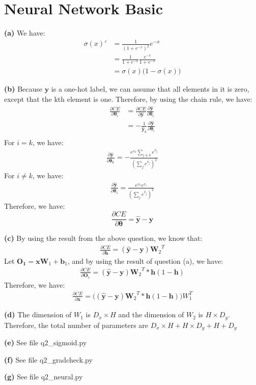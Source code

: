 \documentclass[10pt, a4paper]{ctexart}
\begin{document}
\section{Neural Network Basic}
{\bf{(a)}} We have:
\begin{align*}
    \sigma(x)'&=\frac{1}{(1+e^{-x})^2}e^{-x}\\
    &=\frac{1}{1+e^{-x}}\frac{e^{-x}}{1+e^{-x}}\\
    &=\sigma(x)\big(1-\sigma(x)\big)
\end{align*}\par
{\bf{(b)}} Because $\bm y$ is a one-hot label, we can assume that all elements in it is zero, except that the kth element is one. Therefore, by using the chain rule, we have:
\begin{align*}
    \frac{\partial CE}{\partial {\bm \theta_i}}&=\frac{\partial CE}{\partial {\bm {{\hat y}}}}\frac{\partial {\bm{\hat y}}}{\partial {\bm \theta_i}}\\
    &=-\frac{1}{{\bm {\hat{y}}_k}} \frac{\partial {\bm{\hat y}}}{\partial {\bm \theta_i}}\\
\end{align*}
For $i=k$, we have:
\begin{align*}
    \frac{\partial {\bm{\hat y}}}{\partial {\bm \theta_k}}=-\frac{e^{x_k}\sum_{j\ne k}e^{x_j}}{(\sum_j{e^{x_j}})^2}
\end{align*}
For $i\ne k$, we have:
\begin{align*}
    \frac{\partial {\bm{\hat y}}}{\partial {\bm \theta_i}}=\frac{e^{x_k}e^{x_i}}{(\sum_j{e^{x_j}})^2}
\end{align*}
Therefore, we have:
\begin{equation*}
    \frac{\partial CE}{\partial {\bm \theta}}={\bm{\hat{y}}}-{\bm y}
\end{equation*}\par
{\bf{(c)}} By using the result from the above question, we know that:
\begin{align*}
    \frac{\partial CE}{\partial {\bm h}}=({\bm{\hat{y}}}-{\bm y}){\bm W_2}^T
\end{align*}
Let ${\bm{O_1}}={\bm x}{\bm W_1}+{\bm b_1}$, and by using the result of question (a), we have:
\begin{align*}
    \frac{\partial CE}{\partial {\bm O_1}}=({\bm{\hat{y}}}-{\bm y}){\bm W_2}^T*{\bm h}(1-{\bm h})
\end{align*}
Therefore, we have:
\begin{align*}
    \frac{\partial CE}{\partial {\bm x}}=\Big(({\bm{\hat{y}}}-{\bm y}){\bm W_2}^T*{\bm h}(1-{\bm h})\Big)W_1^T
\end{align*}\par
{\bf{(d)}} The dimension of $W_1$ is $D_x\times H$ and the dimension of $W_2$ is $H\times D_y$. Therefore, the total number of parameters are $D_x\times H+H\times D_y+H+D_y$\par
{\bf{{(e)}}} See file q2\_sigmoid.py\par
{\bf{{(f)}}} See file q2\_gradcheck.py\par
{\bf{(g)}} See file q2\_neural.py
\end{document}
